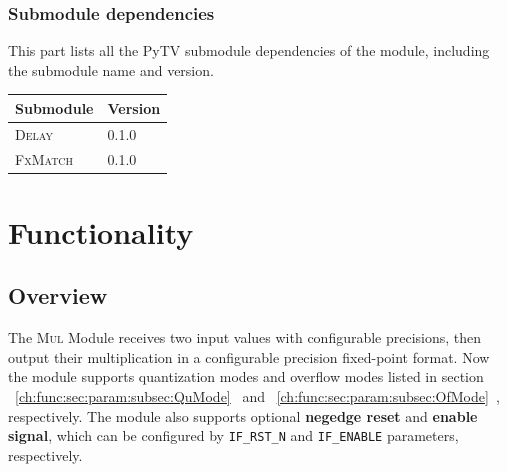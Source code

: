 \documentclass[a4paper, oneside]{report}
\begin{document}
            \subsection{Submodule dependencies}
                This part lists all the PyTV submodule dependencies of the module, including the submodule name and version.
                \begin{longtable}{ll}
                    \toprule
                    \textbf{Submodule} & \textbf{Version} \\
                    \midrule
                    \textsc{Delay}         & 0.1.0 \\
                    \textsc{FxMatch}         & 0.1.0 \\
                    \bottomrule
                \end{longtable}

    \chapter{Functionality}
        \section{Overview}
            The \textsc{Mul} Module receives two input values with configurable precisions, then output their multiplication in a configurable precision fixed-point format. Now the module supports quantization modes and overflow modes listed in section ~\ref{ch:func:sec:param:subsec:QuMode}~ and ~\ref{ch:func:sec:param:subsec:OfMode}~, respectively.  The module also supports optional \textbf{negedge reset} and \textbf{enable signal}, which can be configured by \texttt{IF\_RST\_N} and \texttt{IF\_ENABLE} parameters, respectively.
\end{document}
